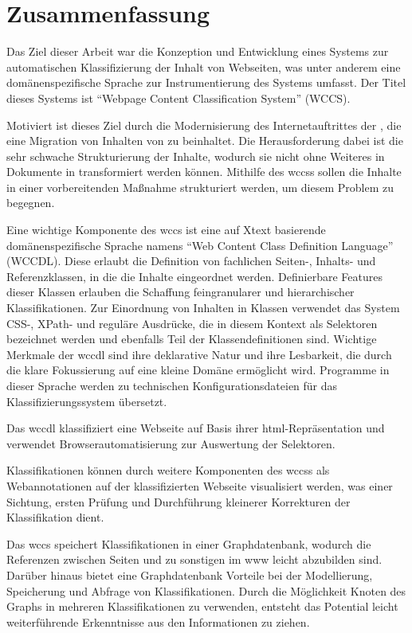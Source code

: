 \section{Zusammenfassung}
    Das Ziel dieser Arbeit war die Konzeption und Entwicklung
    eines Systems zur automatischen Klassifizierung der Inhalt
    von Webseiten, was unter anderem eine domänenspezifische
    Sprache zur Instrumentierung des Systems umfasst.
    Der Titel dieses Systems ist
    "`Webpage Content Classification System"' (WCCS).

    Motiviert ist dieses Ziel durch die Modernisierung des
    Internetauftrittes der {\fernUni},
    die eine Migration von Inhalten von {\wordpress} zu
    {\imperia} beinhaltet.
    Die Herausforderung dabei ist die sehr schwache Strukturierung
    der Inhalte, wodurch sie nicht ohne Weiteres in
    Dokumente in {\imperia} transformiert werden können.
    Mithilfe des \glspl{wccs} sollen die Inhalte in einer vorbereitenden
    Maßnahme strukturiert werden, um diesem Problem zu begegnen.

    Eine wichtige Komponente des \gls{wccs} ist eine auf Xtext basierende
    domänenspezifische Sprache namens "`Web Content Class Definition Language"' (WCCDL).
    Diese erlaubt die Definition von fachlichen Seiten-, Inhalts- und
    Referenzklassen, in die die Inhalte eingeordnet werden.
    Definierbare Features dieser Klassen erlauben die Schaffung feingranularer
    und hierarchischer Klassifikationen.
    Zur Einordnung von Inhalten in Klassen verwendet das System
    CSS-, XPath- und reguläre Ausdrücke, die in diesem Kontext als
    Selektoren bezeichnet werden und
    ebenfalls Teil der Klassendefinitionen sind.
    Wichtige Merkmale der \gls{wccdl} sind ihre deklarative Natur
    und ihre Lesbarkeit,
    die durch die klare Fokussierung auf eine kleine Domäne ermöglicht wird.
    Programme in dieser Sprache werden zu technischen
    Konfigurationsdateien für das Klassifizierungssystem übersetzt.

    Das \gls{wccdl} klassifiziert eine Webseite auf Basis ihrer
    \gls{html}-Repräsentation und verwendet Browserautomatisierung
    zur Auswertung der Selektoren.

    Klassifikationen können durch weitere Komponenten des \glspl{wccs}
    als Webannotationen auf der klassifizierten Webseite visualisiert werden,
    was einer Sichtung, ersten Prüfung und Durchführung kleinerer
    Korrekturen der Klassifikation dient.

    Das \gls{wccs} speichert Klassifikationen in einer Graphdatenbank,
    wodurch die Referenzen zwischen Seiten und zu sonstigen {\resources}
    im \gls{www} leicht abzubilden sind.
    Darüber hinaus bietet eine Graphdatenbank Vorteile bei der Modellierung,
    Speicherung und Abfrage von Klassifikationen.
    Durch die Möglichkeit Knoten des Graphs in mehreren Klassifikationen
    zu verwenden, entsteht das Potential leicht weiterführende Erkenntnisse
    aus den Informationen zu ziehen.

